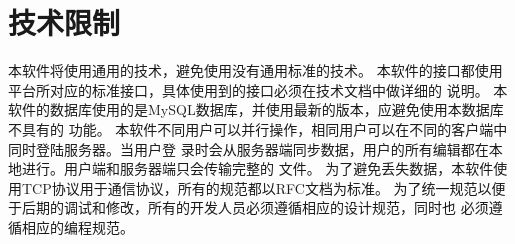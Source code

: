 \section{技术限制}
本软件将使用通用的技术，避免使用没有通用标准的技术。
本软件的接口都使用平台所对应的标准接口，具体使用到的接口必须在技术文档中做详细的 说明。
本软件的数据库使用的是MySQL数据库，并使用最新的版本，应避免使用本数据库不具有的 功能。
本软件不同用户可以并行操作，相同用户可以在不同的客户端中同时登陆服务器。当用户登 录时会从服务器端同步数据，用户的所有编辑都在本地进行。用户端和服务器端只会传输完整的 文件。
为了避免丢失数据，本软件使用TCP协议用于通信协议，所有的规范都以RFC文档为标准。
为了统一规范以便于后期的调试和修改，所有的开发人员必须遵循相应的设计规范，同时也 必须遵循相应的编程规范。

